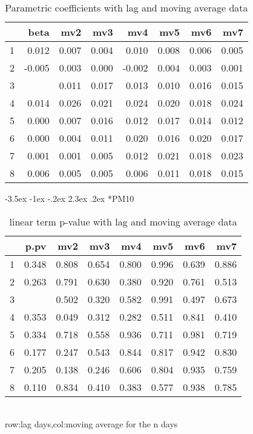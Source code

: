 \documentclass[a4paper, 12pt]{article}
\makeatletter
\def\large{\fontsize{14}{20}\selectfont}
\renewcommand\subsection{\@startsection {subsection}{1}{\z@}%
                                   {-3.5ex \@plus -1ex \@minus -.2ex}%
                                   {2.3ex \@plus.2ex}%
                                   {\centering\normalfont\large\bfseries}}
\makeatother
\begin{document}
\begin{table}[h]
\centering
\caption{Parametric coefficients with lag and moving average data}
\begin{tabular}{rrrrrrrr}
  \hline
 & beta & mv2 & mv3 & mv4 & mv5 & mv6 & mv7 \\
  \hline
1 & 0.012 & 0.007 & 0.004 & 0.010 & 0.008 & 0.006 & 0.005 \\
  2 & -0.005 & 0.003 & 0.000 & -0.002 & 0.004 & 0.003 & 0.001 \\
  3 & \color{red}{0.018} & 0.011 & 0.017 & 0.013 & 0.010 & 0.016 & 0.015 \\
  4 &0.014 & 0.026 & 0.021 & 0.024 & 0.020 & 0.018 & 0.024 \\
  5 & 0.000 & 0.007 & 0.016 & 0.012 & 0.017 & 0.014 & 0.012 \\
  6 & 0.000 & 0.004 & 0.011 & 0.020 & 0.016 & 0.020 & 0.017 \\
  7 & 0.001 & 0.001 & 0.005 & 0.012 & 0.021 & 0.018 & 0.023 \\
  8 & 0.006 & 0.005 & 0.005 & 0.006 & 0.011 & 0.018 & 0.015 \\
   \hline
\end{tabular}
\end{table}
\clearpage
\subsection*{PM10}
\begin{table}[h]
\centering
\caption{linear term p-value with lag and moving average data}
\begin{tabular}{rrrrrrrr}
  \hline
 & p.pv & mv2 & mv3 & mv4 & mv5 & mv6 & mv7 \\
  \hline
1 & 0.348 & 0.808 & 0.654 & 0.800 & 0.996 & 0.639 & 0.886 \\
  2 & 0.263 & 0.791 & 0.630 & 0.380 & 0.920 & 0.761 & 0.513 \\
  3 & \color{red}{0.048} & 0.502 & 0.320 & 0.582 & 0.991 & 0.497 & 0.673 \\
  4 & 0.353 & 0.049 & 0.312 & 0.282 & 0.511 & 0.841 & 0.410 \\
  5 & 0.334 & 0.718 & 0.558 & 0.936 & 0.711 & 0.981 & 0.719 \\
  6 & 0.177 & 0.247 & 0.543 & 0.844 & 0.817 & 0.942 & 0.830 \\
  7 & 0.205 & 0.138 & 0.246 & 0.606 & 0.804 & 0.935 & 0.759 \\
  8 & 0.110 & 0.834 & 0.410 & 0.383 & 0.577 & 0.938 & 0.785 \\
   \hline
\end{tabular}
\\row:lag days,col:moving average for the n days
\end{table}
\end{document}
